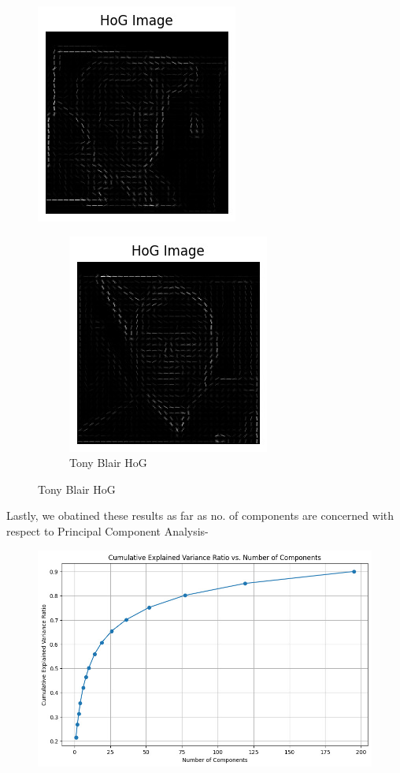 \documentclass[a4paper]{article}
\theoremstyle{plain}
\theoremstyle{definition}
\begin{document}
 \begin{figure}[H]
     \centering
     \includegraphics[width=0.5\linewidth]{WhatsApp Image 2024-04-21 at 14.27.12_e2561c98.jpg}
     \caption{George Bush HoG}
\begin{figure}[H]
         \centering
         \includegraphics[width=0.5\linewidth]{WhatsApp Image 2024-04-21 at 14.27.33_57021518.jpg}
         \caption{Tony Blair HoG }
         \label{fig:enter-label}
     \end{figure}
          \label{fig:enter-label}
 \end{figure}

 Lastly, we obatined these results as far as no. of components are concerned with respect to Principal Component Analysis-
 \begin{figure}[H]
     \centering
     \includegraphics[width=0.75\linewidth]{WhatsApp Image 2024-04-21 at 14.24.12_4f165bf8.jpg}
 \end{figure}
\end{document}
